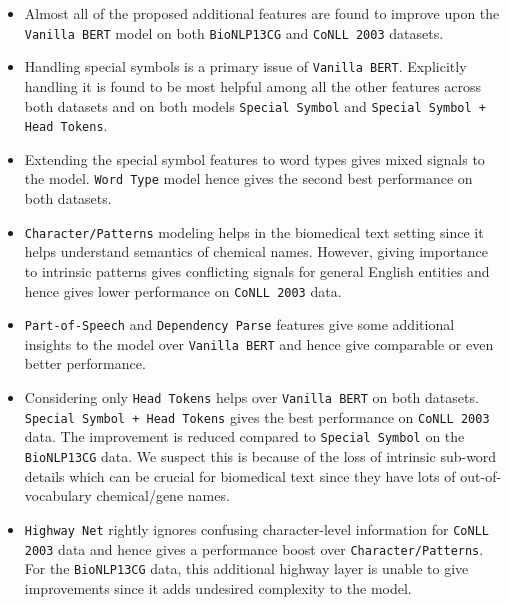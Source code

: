 \begin{itemize}
    \item Almost all of the proposed additional features are found to improve upon the \texttt{Vanilla BERT} model on both \texttt{BioNLP13CG} and \texttt{CoNLL 2003} datasets.
    
    \item Handling special symbols is a primary issue of \texttt{Vanilla BERT}. Explicitly handling it is found to be most helpful among all the other features across both datasets and on both models \texttt{Special Symbol} and \texttt{Special Symbol + Head Tokens}.
    
    \item Extending the special symbol features to word types gives mixed signals to the model. \texttt{Word Type} model hence gives the second best performance on both datasets.
    
    \item \texttt{Character/Patterns} modeling helps in the biomedical text setting since it helps understand semantics of chemical names. However, giving importance to intrinsic patterns gives conflicting signals for general English entities and hence gives lower performance on \texttt{CoNLL 2003} data.
    
    \item \texttt{Part-of-Speech} and \texttt{Dependency Parse} features give some additional insights to the model over \texttt{Vanilla BERT} and hence give comparable or even better performance. 
    
    \item Considering only \texttt{Head Tokens} helps over \texttt{Vanilla BERT} on both datasets. \texttt{Special Symbol + Head Tokens} gives the best performance on \texttt{CoNLL 2003} data. The improvement is reduced compared to \texttt{Special Symbol} on the \texttt{BioNLP13CG} data. We suspect this is because of the loss of intrinsic sub-word details which can be crucial for biomedical text since they have lots of out-of-vocabulary chemical/gene names.
    
    \item \texttt{Highway Net} rightly ignores confusing character-level information for \texttt{CoNLL 2003} data and hence gives a performance boost over \texttt{Character/Patterns}. For the \texttt{BioNLP13CG} data, this additional highway layer is unable to give improvements since it adds undesired complexity to the model.
\end{itemize}


